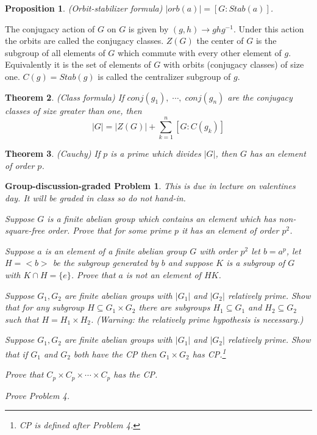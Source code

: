 \documentclass[12pt]{article}
\def\su{\subseteq}
\newtheorem{theorem}{Theorem}
\newtheorem{prop}[theorem]{Proposition}
\newtheorem{disc}[prob]{Group-discussion-graded Problem}
\newenvironment{enum}
{\begin{list}{(\alph{enumi})}
{\usecounter{enumi}\setlength{\rightmargin}{\leftmargin}}}
{\end{list}}
\begin{document}
\begin{prop}
(Orbit-stabilizer formula) $|orb(a)|=[G:Stab(a)]$.
\end{prop}

The conjugacy action of $G$ on $G$ is given by $(g,h) \to ghg^{-1}$.
Under this action the orbits are called the conjugacy classes.
$Z(G)$ the center of $G$ is the subgroup of all elements of
$G$ which commute with every other element of $g$.  Equivalently
it is the set of elements of $G$ with orbits (conjugacy classes) 
of size one. $C(g)=Stab(g)$ is called the centralizer subgroup of $g$.

\begin{theorem}
(Class formula) If $conj(g_1),\;\cdots, \; conj(g_n)$ are the
conjugacy classes of size greater
than one, then
$$|G|=|Z(G)| +\sum_{k=1}^n [G:C(g_k)]$$
\end{theorem}

\begin{theorem}
(Cauchy) If $p$ is a prime which divides $|G|$, then $G$ has
an element of order $p$.
\end{theorem}

\begin{disc}
This is due in lecture on valentines day.  It will be graded
in class so do not hand-in.
\begin{enum}
\item Suppose $G$ is a finite abelian group which contains an
element which has non-square-free order. Prove that for some prime
$p$ it has an element of order $p^2$.
\item Suppose $a$ is an element of a finite abelian group $G$ with
order $p^2$ let $b=a^p$, let $H=<b>$ be the subgroup generated
by $b$ and suppose $K$ is a subgroup of $G$ with $K\cap H=\{e\}$.
Prove that $a$ is not an element of $HK$.
\item Suppose $G_1,G_2$ are finite abelian groups with $|G_1|$ and
$|G_2|$ relatively prime.  Show that for any subgroup $H\su G_1\times G_2$
there are subgroups $H_1\su G_1$ and $H_2\su G_2$ such that
$H=H_1\times H_2$.   (Warning: the relatively prime hypothesis is
necessary.)
\item Suppose $G_1,G_2$ are finite abelian groups with $|G_1|$ and
$|G_2|$ relatively prime.  Show that if $G_1$ and $G_2$ both have
the CP then $G_1\times G_2$ has CP.\footnote{CP is defined after Problem 4.}
\item Prove that $C_p\times C_p\times \cdots \times C_p$ has the CP.
\item Prove Problem 4.
\end{enum}
\end{disc}
\end{document}
